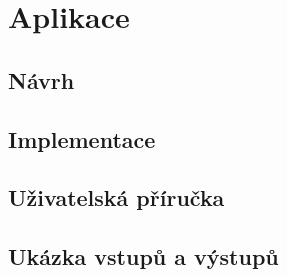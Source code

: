 
\chapter{Aplikace} \label{kap_aplikace}

\section{Návrh}

\section{Implementace}

\section{Uživatelská příručka}

\section{Ukázka vstupů a výstupů}

